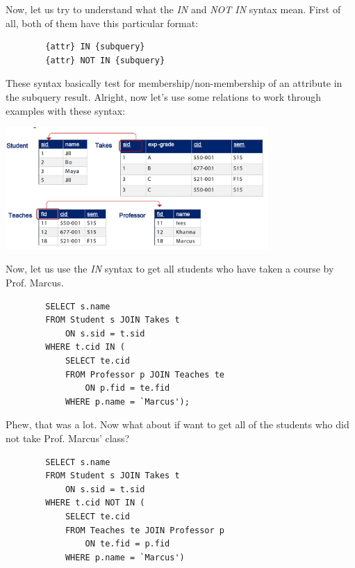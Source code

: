 \documentclass{article}
\begin{document}
Now, let us try to understand what the \textit{IN} and \textit{NOT IN} syntax mean. First of all, both of them have this particular format:

\begin{tcolorbox}
    \begin{verbatim}
        {attr} IN {subquery}
        {attr} NOT IN {subquery}
    \end{verbatim}
\end{tcolorbox}

These syntax basically test for membership/non-membership of an attribute in the subquery result. Alright, now let's use some relations to work through examples with these syntax:

\includegraphics[width=10cm]{Assets/subqueriesExample.png}

Now, let us use the \textit{IN} syntax to get all students who have taken a course by Prof. Marcus.

\begin{tcolorbox}
    \begin{verbatim}
        SELECT s.name
        FROM Student s JOIN Takes t
            ON s.sid = t.sid
        WHERE t.cid IN (
            SELECT te.cid
            FROM Professor p JOIN Teaches te
                ON p.fid = te.fid
            WHERE p.name = `Marcus');
    \end{verbatim}
\end{tcolorbox}

Phew, that was a lot. Now what about if want to get all of the students who did not take Prof. Marcus' class?

\begin{tcolorbox}
    \begin{verbatim}
        SELECT s.name
        FROM Student s JOIN Takes t
            ON s.sid = t.sid
        WHERE t.cid NOT IN (
            SELECT te.cid
            FROM Teaches te JOIN Professor p
                ON te.fid = p.fid
            WHERE p.name = `Marcus')
    \end{verbatim}
\end{tcolorbox}
\end{document}
